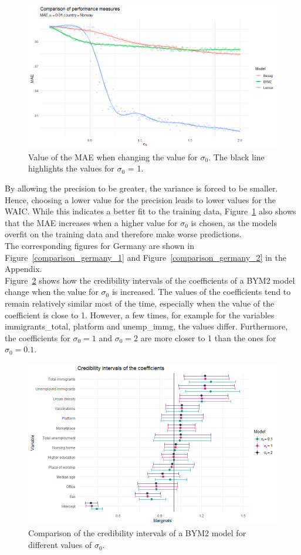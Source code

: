 \begin{figure}[H]
  \centering
  \includegraphics[width = \textwidth]{mae_norway.png}
  \caption{Value of the MAE when changing the value for $\sigma_0$. The black line highlights the values for $\sigma_0$ = 1.}
  \label{comparison_norway_2}
\end{figure}
By allowing the precision to be greater, the variance is forced to be smaller. Hence, choosing a lower value for the precision leads to lower values for the WAIC. While this indicates a better fit to the training data, Figure~\ref{comparison_norway_2} also shows that the MAE increases when a higher value for $\sigma_0$ is chosen, as the models overfit on the training data and therefore make worse predictions. \\
The corresponding figures for Germany are shown in Figure~\ref{comparison_germany_1} and Figure~\ref{comparison_germany_2} in the Appendix. \\
Figure~\ref{comparison_norway_5} shows how the credibility intervals of the coefficients of a BYM2 model change when the value for $\sigma_0$ is increased. The values of the coefficients tend to remain relatively similar most of the time, especially when the value of the coefficient is close to 1. However, a few times, for example for the variables immigrants\_total, platform and unemp\_immg, the values differ. Furthermore, the coefficients for $\sigma_0 = 1$ and $\sigma_0 = 2$ are more closer to 1 than the ones for $\sigma_0=0.1$.
\begin{figure}[H]
  \centering
  \includegraphics[width = \textwidth]{intervals_prior_norway.png}
  \caption{Comparison of the credibility intervals of a BYM2 model for different values of $\sigma_0$.}
  \label{comparison_norway_5}
\end{figure}
